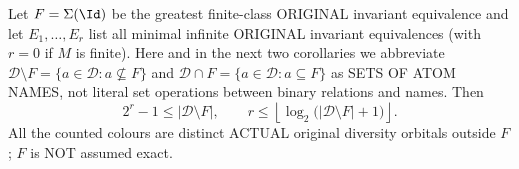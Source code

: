 \begin{lemma}
\label{lem:rh-direction-palette-bound}
Let $F=\Sigma(\Id)$ be the greatest finite-class ORIGINAL invariant
equivalence and let $E_1,\ldots,E_r$ list all minimal infinite
ORIGINAL invariant equivalences (with $r=0$ if $M$ is finite).
Here and in the next two corollaries we abbreviate
$\mathcal D\setminus F=\{a\in\mathcal D:a\not\subseteq F\}$
and
$\mathcal D\cap F=\{a\in\mathcal D:a\subseteq F\}$
as SETS OF ATOM NAMES, not literal set operations between
binary relations and names.
Then
\[
   2^r-1\le|\mathcal D\setminus F|,
   \qquad
   r\le\left\lfloor
       \log_2\bigl(|\mathcal D\setminus F|+1\bigr)
                         \right\rfloor.
\]
All the counted colours are distinct ACTUAL original diversity
orbitals outside $F$; $F$ is NOT assumed exact.
\end{lemma}
